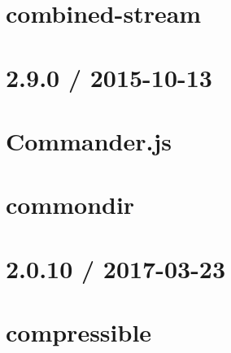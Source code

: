 \documentclass[twoside]{book}
\newcommand{\+}{\discretionary{\mbox{\scriptsize$\hookleftarrow$}}{}{}}
\begin{document}
\chapter{combined-\/stream}
\label{md__c_1_workspace_demo_src_main_script_node_modules_combined-stream__readme}

\chapter{2.9.0 / 2015-\/10-\/13}
\label{md__c_1_workspace_demo_src_main_script_node_modules_commander__history}

\chapter{Commander.\+js}
\label{md__c_1_workspace_demo_src_main_script_node_modules_commander__readme}

\chapter{commondir}
\label{md__c_1_workspace_demo_src_main_script_node_modules_commondir_readme}

\chapter{2.0.10 / 2017-\/03-\/23}
\label{md__c_1_workspace_demo_src_main_script_node_modules_compressible__h_i_s_t_o_r_y}

\chapter{compressible}
\label{md__c_1_workspace_demo_src_main_script_node_modules_compressible__r_e_a_d_m_e}

\end{document}
